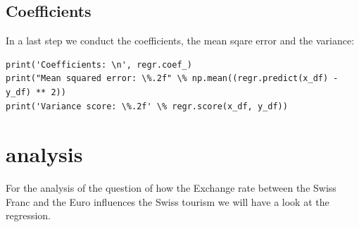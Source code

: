 \documentclass[12pt,a4paper,bibliography=totocnumbered,listof=totocnumbered]{scrartcl}
\begin{document}
\subsection{Coefficients}
In a last step we conduct the coefficients, the mean sqare error and the variance:
\begin{verbatim}
print('Coefficients: \n', regr.coef_)
print("Mean squared error: \%.2f" \% np.mean((regr.predict(x_df) - y_df) ** 2))
print('Variance score: \%.2f' \% regr.score(x_df, y_df))
\end{verbatim}
\section{analysis}
For the analysis of the question of how the Exchange rate between the Swiss Franc and the Euro influences the Swiss tourism we will have a look at the regression. 
\usepackage{subfigure}
\end{document}
